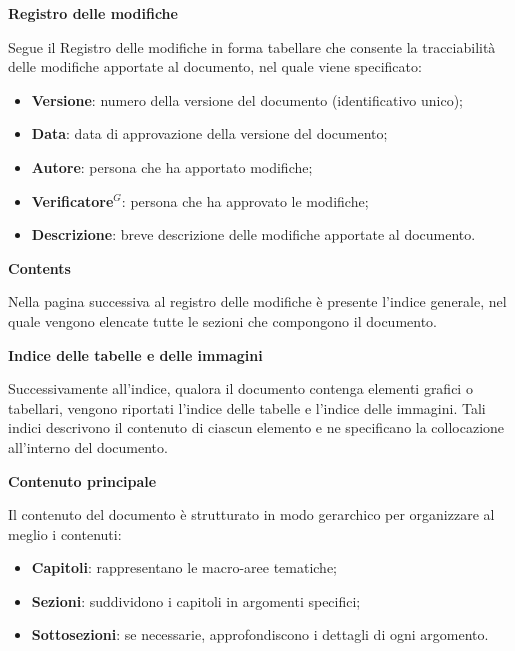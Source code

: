 \label{sec:registro-modifiche}
\begin{center}
\textbf{Registro delle modifiche}
\end{center}
\vspace{-0.5em}
Segue il Registro delle modifiche in forma tabellare che consente la tracciabilità delle modifiche apportate al documento, nel quale viene specificato: 
    \begin{itemize}[itemsep=3pt, parsep=1pt, label=$\scriptstyle\bullet$]
        \item \textbf{Versione}: numero della versione del documento (identificativo unico);
        \item \textbf{Data}: data di approvazione della versione del documento;
        \item \textbf{Autore}: persona che ha apportato modifiche;
        \item \textbf{Verificatore$^G$}: persona che ha approvato le modifiche;
        \item \textbf{Descrizione}: breve descrizione delle modifiche apportate al documento.
    \end{itemize}

\begin{center}
\textbf{Contents}
\end{center}
\vspace{-0.5em}
Nella pagina successiva al registro delle modifiche è presente l'indice generale, nel quale vengono elencate tutte le sezioni che compongono il documento.

\begin{center}
\textbf{Indice delle tabelle e delle immagini}
\end{center}
\vspace{-0.5em}
Successivamente all'indice, qualora il documento contenga elementi grafici o tabellari, vengono riportati l'indice delle tabelle e l'indice delle immagini. 
Tali indici descrivono il contenuto di ciascun elemento e ne specificano la collocazione all'interno del documento.

\begin{center}
\textbf{Contenuto principale}
\end{center}
\vspace{-0.5em}
Il contenuto del documento è strutturato in modo gerarchico per organizzare al meglio i contenuti:
\begin{itemize}[itemsep=3pt, parsep=1pt, label=$\scriptstyle\bullet$]
    \item \textbf{Capitoli}: rappresentano le macro-aree tematiche;
    \item \textbf{Sezioni}: suddividono i capitoli in argomenti specifici;
    \item \textbf{Sottosezioni}: se necessarie, approfondiscono i dettagli di ogni argomento.
\end{itemize}
\vspace{0.1em}

